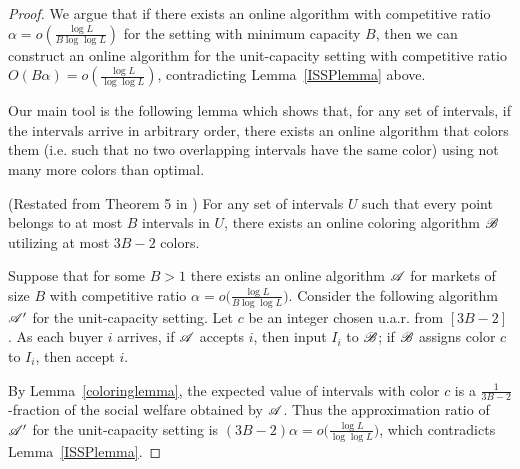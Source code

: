 \begin{proof}
  We argue that if there exists an online algorithm with competitive 
  ratio $\alpha=o\left(\frac{\log L}{B\log\log L}\right)$ for the setting with minimum
  capacity $B$, then we can construct an online algorithm for the
  unit-capacity setting with competitive ratio $O(B\alpha) = o\left(\frac{\log
    L}{\log\log L}\right)$, contradicting Lemma~\ref{ISSPlemma} above.

  Our main tool is the following lemma which shows that, for
    any set of intervals, if the intervals arrive in arbitrary order, there
    exists an online algorithm that colors them (i.e. such that no two
    overlapping intervals have the same color) using not many more colors than
    optimal.

    \begin{lemma}\label{coloringlemma}
        (Restated from Theorem 5 in \cite{kierstead1981extremal}) For any set
        of intervals $U$ such that every point belongs to at most $B$ intervals
        in $U$, there exists an online coloring algorithm $\mathscr{B}$ utilizing
        at most $3B-2$ colors. 
    \end{lemma}

    Suppose that for some $B>1$ there exists an online algorithm $\mathscr{A}$ for
    markets of size $B$ with competitive ratio $\alpha=o\big(\frac{\log L}{B\log\log
    L}\big)$. Consider the following algorithm $\mathscr{A}'$ for the unit-capacity
    setting. Let $c$ be an integer chosen u.a.r. from $[3B-2]$. As each buyer $i$
    arrives, if $\mathscr{A}$ accepts $i$, then input $I_i$ to $\mathscr{B}$; if
    $\mathscr{B}$ assigns color $c$ to $I_i$, then accept $i$.


    By Lemma~\ref{coloringlemma}, the expected value of intervals with color
    $c$ is a $\frac{1}{3B-2}$-fraction of the social welfare obtained by
    $\mathscr{A}$. Thus the approximation ratio of $\mathscr{A}'$ for the unit-capacity
    setting is $(3B-2)\alpha = o\big(\frac{\log L}{\log\log L}\big)$, which contradicts
    Lemma~\ref{ISSPlemma}.
\end{proof}

